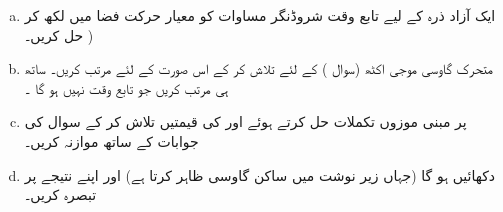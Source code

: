 \begin{enumerate}[a.]
\item 
 ایک آزاد ذرہ کے لیے تابع وقت شروڈنگر مساوات کو معیار حرکت فضا میں لکھ کر حل کریں۔  ) 
\item
 متحرک گاوسی موجی اکٹھ (سوال ) کے لئے  تلاش کر کے اس صورت کے لئے   مرتب کریں۔ ساتھ ہی  مرتب کریں  جو تابع وقت نہیں ہو گا ۔ 
 \item
  پر مبنی موزوں تکملات حل کرتے ہوئے  اور  کی قیمتیں تلاش کر کے سوال  کی جوابات کے ساتھ موازنہ کریں۔ 
 \item
 دکھائیں  ہو گا (جہاں زیر نوشت میں ساکن گاوسی ظاہر کرتا ہے) اور اپنے نتیجے پر تبصرہ کریں۔
 \end{enumerate}


